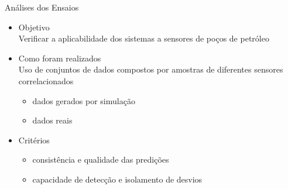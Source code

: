 \documentclass{beamer}
\begin{document}
\begin{frame}{Análises dos Ensaios}

    \begin{itemize}
        \item Objetivo\\
            Verificar a \alert{aplicabilidade} dos sistemas a sensores de poços de petróleo
            \vspace{10pt}

        \item Como foram realizados\\
            Uso de conjuntos de dados compostos por amostras de diferentes
            \alert{sensores correlacionados}
            \begin{itemize}
                \item dados gerados por simulação
                \item dados reais
            \end{itemize}
            \vspace{10pt}

        \item Critérios
            \begin{itemize}
                \item \alert{consistência} e \alert{qualidade} das predições
                \item capacidade de \alert{detecção} e \alert{isolamento} de desvios
            \end{itemize}
    \end{itemize}

    
\end{frame}
\end{document}
